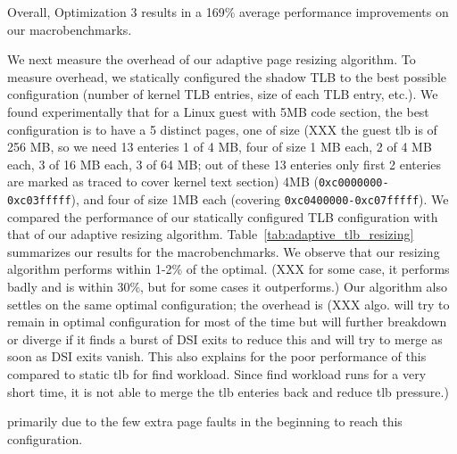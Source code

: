\documentclass[10pt,twocolumn]{article}
\begin{document}
Overall,
Optimization 3 results in a 169\% average performance
improvements on our macrobenchmarks.



We next measure the overhead of our adaptive page resizing algorithm. To
measure overhead, we statically configured the shadow TLB to the best
possible configuration (number of kernel TLB entries, size of each TLB
entry, etc.). We found experimentally that for a Linux guest with 5MB code
section, the best configuration is to have a 5 distinct pages, one of size
(XXX the guest tlb is of 256 MB, so we need 13 enteries 
1 of 4 MB, four of size 1 MB each, 2 of 4 MB each, 3 of 16 MB each, 3 of 64 MB; out of 
these 13 enteries only first 2 enteries are marked as traced to cover kernel text
section)
4MB ({\tt 0xc0000000-0xc03fffff}), and
four of size 1MB each (covering {\tt 0xc0400000-0xc07fffff}). We compared the
performance of
our statically configured TLB configuration with that of our adaptive resizing
algorithm.
Table~\ref{tab:adaptive_tlb_resizing} summarizes our results for the macrobenchmarks.
We observe that our resizing algorithm performs within 1-2\% of the optimal.
(XXX for some case, it performs badly and is within 30\%, but for some cases it outperforms.)
Our algorithm also settles on the same optimal configuration; the overhead is
(XXX algo. will try to remain in optimal configuration for most of the time 
but will further breakdown or diverge if it finds a burst of DSI exits to reduce this
and will try to merge as soon as DSI exits vanish. This also explains for the poor 
performance of this compared to static tlb for find workload. Since find workload runs
for a very short time, it is not able to merge the tlb enteries back and reduce tlb pressure.)
 
primarily due to the few extra page faults in the beginning to reach this configuration.
\end{document}
